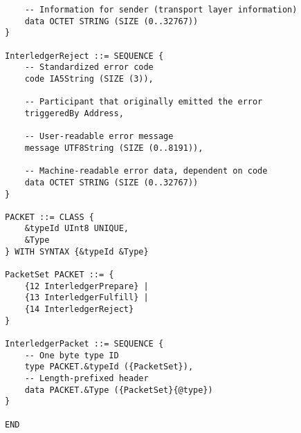 \documentclass[11pt,twoside,a4paper]{article}
\begin{document}
\begin{verbatim}
    -- Information for sender (transport layer information)
    data OCTET STRING (SIZE (0..32767))
}

InterledgerReject ::= SEQUENCE {
    -- Standardized error code
    code IA5String (SIZE (3)),

    -- Participant that originally emitted the error
    triggeredBy Address,

    -- User-readable error message
    message UTF8String (SIZE (0..8191)),

    -- Machine-readable error data, dependent on code
    data OCTET STRING (SIZE (0..32767))
}

PACKET ::= CLASS {
    &typeId UInt8 UNIQUE,
    &Type
} WITH SYNTAX {&typeId &Type}

PacketSet PACKET ::= {
    {12 InterledgerPrepare} |
    {13 InterledgerFulfill} |
    {14 InterledgerReject}
}

InterledgerPacket ::= SEQUENCE {
    -- One byte type ID
    type PACKET.&typeId ({PacketSet}),
    -- Length-prefixed header
    data PACKET.&Type ({PacketSet}{@type})
}

END
\end{verbatim}


\end{document}
